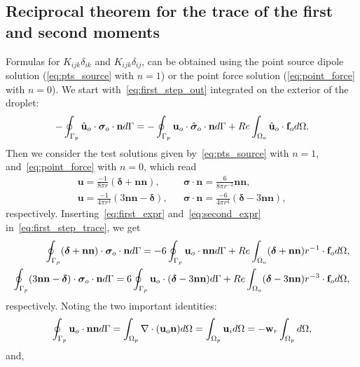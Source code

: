 \subsection{Reciprocal theorem for the trace of the first and second moments}
Formulas for $K_{ijk}\delta_{ik}$ and $K_{ijk}\delta_{ij}$, can be obtained using the point source dipole solution (\ref{eq:pts_source} with $n=1$) or the point force solution (\ref{eq:point_force} with $n=0$). 
We start with~\ref{eq:first_step_out} integrated on the exterior of the droplet: 
\begin{equation}
    -\intS[p]{\hat{\textbf{u}}_{o} \cdot  \bm\sigma_{o}\cdot \textbf{n}}
    =
    -\intS[p]{\textbf{u}_{o} \cdot \hat{\bm\sigma}_{o}\cdot \textbf{n}}
    + 
    Re\intO[o]{\hat{\textbf{u}}_{o}\cdot \textbf{f}_{o}}.
    \label{eq:first_step_trace}
\end{equation}
Then we consider the test solutions given by~\ref{eq:pts_source} with $n=1$, and~\ref{eq:point_force} with $n=0$, which read
\begin{align}
    \textbf{u} = \frac{-1}{8\pi r}(\bm\delta + \textbf{nn}),
    && \bm\sigma\cdot \textbf{n} = \frac{6}{8\pi r^{-2}}\textbf{nn},
    \label{eq:first_expr}
    \\
    \textbf{u} = \frac{-1}{4\pi r^3}(3\textbf{nn}- \bm\delta),
    && \bm\sigma\cdot \textbf{n} = \frac{- 6}{4\pi r^4} (\bm\delta - 3\textbf{nn}),
    \label{eq:second_expr}
\end{align}
respectively. 
Inserting~\ref{eq:first_expr} and~\ref{eq:second_expr} in~\ref{eq:first_step_trace}, we get
\begin{align}
    \label{eq:trace1}
    \intS[p]{(\bm\delta + \textbf{nn}) \cdot  \bm\sigma_{o}\cdot \textbf{n}}
    =
    - 6\intS[p]{\textbf{u}_{o} \cdot \textbf{nn}}
    + 
    Re\intO[o]{(\bm\delta + \textbf{nn})r^{-1}\cdot \textbf{f}_{o}},\\
    \intS[p]{(3\textbf{nn}-\bm\delta) \cdot  \bm\sigma_{o}\cdot \textbf{n}}
    =
    6\intS[p]{\textbf{u}_{o} \cdot (\bm\delta - 3\textbf{nn})}
    + 
    Re\intO[o]{(\bm\delta - 3\textbf{nn})r^{-3}\cdot \textbf{f}_{o}},
    \label{eq:trace2}
\end{align}
respectively. 
Noting the two important identities: 
\begin{equation}
    \intS[p]{\textbf{u}_{o} \cdot \textbf{nn}}
    =
    \intO[p]{\div (\textbf{u}_{o}\textbf{n})}
    = \intO[p]{ \textbf{u}_i}
    = - \textbf{w}_r \intO[p]{},
\end{equation}
and, 
